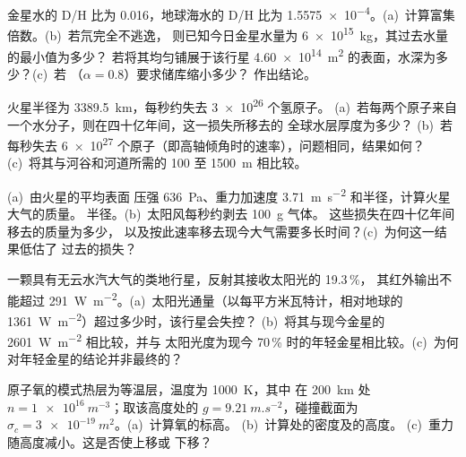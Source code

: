 \begin{exercise}[$\star\star$]\label{exo:b3:planetary-atmospheres:6}
金星水的 D/H 比为 \num{0.016}，地球海水的
D/H 比为 \num{1.5575e-4}。(a)~计算富集倍数。(b)~若氘完全不逃逸，
则已知今日金星水量为 \qty{6e15}{kg}，其过去水量的最小值为多少？
若将其均匀铺展于该行星 \qty{4.60e14}{m^2} 的表面，水深为多少？(c)~若
（$\alpha = 0.8$）要求储库缩小多少？
作出结论。
\end{exercise}

\begin{exercise}[$\star\star$]\label{exo:b3:planetary-atmospheres:7}
火星半径为 \qty{3389.5}{km}，每秒约失去 \num{3e26} 个氢原子。
(a)~若每两个原子来自一个水分子，则在四十亿年间，这一损失所移去的
全球水层厚度为多少？
(b)~若每秒失去 \num{6e27} 个原子（即高轴倾角时的速率），问题相同，结果如何？
(c)~将其与河谷和河道所需的 100 至 \qty{1500}{m}
相比较。
\end{exercise}

\begin{exercise}[$\star\star$]\label{exo:b3:planetary-atmospheres:8}
(a)~由火星的平均表面
压强 \qty{636}{Pa}、重力加速度 \qty{3.71}{m.s^{-2}} 和半径，计算火星大气的质量。
半径。(b)~太阳风每秒约剥去 \qty{100}{g} 气体。
这些损失在四十亿年间移去的质量为多少，
以及按此速率移去现今大气需要多长时间？(c)~为何这一结果低估了
过去的损失？
\end{exercise}

\begin{exercise}[$\star\star$]\label{exo:b3:planetary-atmospheres:9}
一颗具有无云水汽大气的类地行星，反射其接收太阳光的 19.3\,\%，
其红外输出不能超过
\qty{291}{W.m^{-2}}。(a)~太阳光通量（以每平方米瓦特计，相对地球的
\qty{1361}{W.m^{-2}}）超过多少时，该行星会失控？
(b)~将其与现今金星的 \qty{2601}{W.m^{-2}} 相比较，并与
太阳光度为现今 70\,\% 时的年轻金星相比较。(c)~为何
对年轻金星的结论并非最终的？
\end{exercise}

\begin{exercise}[$\star\star\star$]\label{exo:b3:planetary-atmospheres:10}
原子氧的模式热层为等温层，温度为 \qty{1000}{K}，其中
在 \qty{200}{km} 处 $n = \qty{1e16}{m^{-3}}$；取该高度处的 $g =
\qty{9.21}{m.s^{-2}}$，碰撞截面为
$\sigma_c = \qty{3e-19}{m^2}$。(a)~计算氧的标高。
(b)~计算处的密度及的高度。
(c)~重力随高度减小。这是否使上移或
下移？
\end{exercise}


